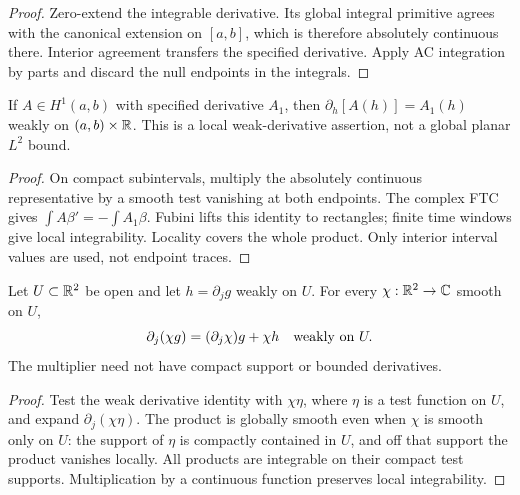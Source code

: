 \begin{proof}
\leanok
Zero-extend the integrable derivative. Its global integral primitive agrees
with the canonical extension on $[a,b]$, which is therefore absolutely
continuous there. Interior agreement transfers the specified derivative.
Apply AC integration by parts and discard the null endpoints in the integrals.
\end{proof}

\begin{lemma}
\label{lem:interval-h1-weak-lift}
\leanok
If $A\in H^1(a,b)$ with specified derivative $A_1$, then
$\partial_h[A(h)]=A_1(h)$ weakly on $(a,b)\times\mathbb{R}$.
This is a local weak-derivative assertion, not a global planar $L^2$ bound.
\end{lemma}

\begin{proof}
\leanok
On compact subintervals, multiply the absolutely continuous representative
by a smooth test vanishing at both endpoints.
The complex FTC gives $\int A\beta'=-\int A_1\beta$.
Fubini lifts this identity to rectangles; finite time windows give local
integrability. Locality covers the whole product.
Only interior interval values are used, not endpoint traces.
\end{proof}

\begin{lemma}
\label{lem:weak-derivative-product}
\leanok
Let $U\subset\mathbb{R}^2$ be open and let $h=\partial_jg$ weakly on $U$.
For every $\chi:\mathbb{R}^2\to\mathbb C$ smooth on $U$,
\[
 \partial_j(\chi g)=(\partial_j\chi)g+\chi h
 \quad\hbox{weakly on }U.
\]
The multiplier need not have compact support or bounded derivatives.
\end{lemma}

\begin{proof}
\leanok
Test the weak derivative identity with $\chi\eta$, where $\eta$ is a test
function on $U$, and expand $\partial_j(\chi\eta)$. The product is globally
smooth even when $\chi$ is smooth only on $U$: the support of $\eta$ is
compactly contained in $U$, and off that support the product vanishes locally.
All products are integrable on their compact test supports.
Multiplication by a continuous function preserves local integrability.
\end{proof}

